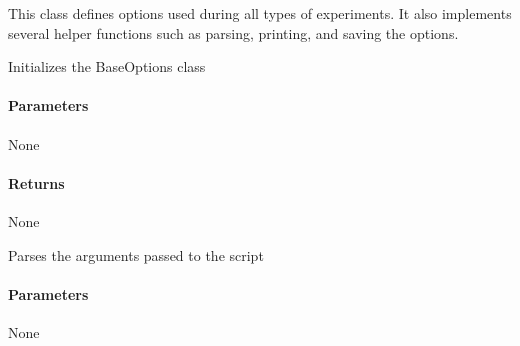 \documentclass[letterpaper,10pt,english]{sphinxmanual}
\begin{document}
\begin{fulllineitems}
\label{\detokenize{autoapi/base_options/index:base_options.BaseOptions}}
\pysigstartsignatures
{}
\pysigstopsignatures
\sphinxAtStartPar
This class defines options used during all types of experiments.
It also implements several helper functions such as parsing, printing, and saving the options.

\begin{fulllineitems}
\label{\detokenize{autoapi/base_options/index:base_options.BaseOptions.initialize}}
\pysigstartsignatures
{}
\pysigstopsignatures
\sphinxAtStartPar
Initializes the BaseOptions class


\paragraph{Parameters}
\label{\detokenize{autoapi/base_options/index:parameters}}
\sphinxAtStartPar
None


\paragraph{Returns}
\label{\detokenize{autoapi/base_options/index:returns}}
\sphinxAtStartPar
None

\end{fulllineitems}


\begin{fulllineitems}
\label{\detokenize{autoapi/base_options/index:base_options.BaseOptions.parse}}
\pysigstartsignatures
{}
\pysigstopsignatures
\sphinxAtStartPar
Parses the arguments passed to the script


\paragraph{Parameters}
\label{\detokenize{autoapi/base_options/index:id1}}
\sphinxAtStartPar
None



\end{fulllineitems}
\end{fulllineitems}
\end{document}
